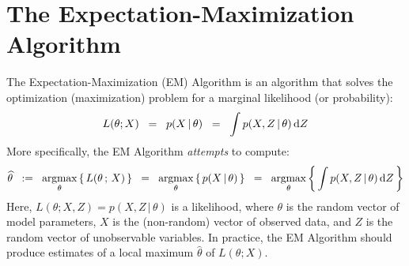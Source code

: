\section{The Expectation-Maximization Algorithm}
\setcounter{theorem}{0}
\setcounter{equation}{0}


The Expectation-Maximization (EM) Algorithm is an algorithm that solves the optimization
(maximization) problem for a marginal likelihood (or probability):
\begin{equation*}
L(\theta;X) \;\; = \;\; p(X\,|\,\theta) \;\; = \;\; \int p(X,Z\,|\,\theta) \,\textnormal{d}Z
\end{equation*}
More specifically, the EM Algorithm \textit{attempts} to compute:
\begin{equation*}
\widehat{\theta}
\;\; := \;\;
\underset{\theta}{\textnormal{argmax}}\left\{\,L(\theta\,;\,X)\,\right\}
\;\; = \;\;
\underset{\theta}{\textnormal{argmax}}\left\{\,p(X\,|\,\theta)\,\right\}
\;\; = \;\;
\underset{\theta}{\textnormal{argmax}}\left\{\,\int p(X,Z\,|\,\theta) \,\textnormal{d}Z\,\right\}
\end{equation*}
Here, $L(\theta;X,Z) = p(X,Z\,|\,\theta)$ is a likelihood, where $\theta$ is the random vector of model
parameters, $X$ is the (non-random) vector of observed data, and $Z$ is the random vector of
unobservable variables.
In practice, the EM Algorithm should produce estimates of a local maximum $\widehat{\theta}$ of $L(\theta;X)$.

